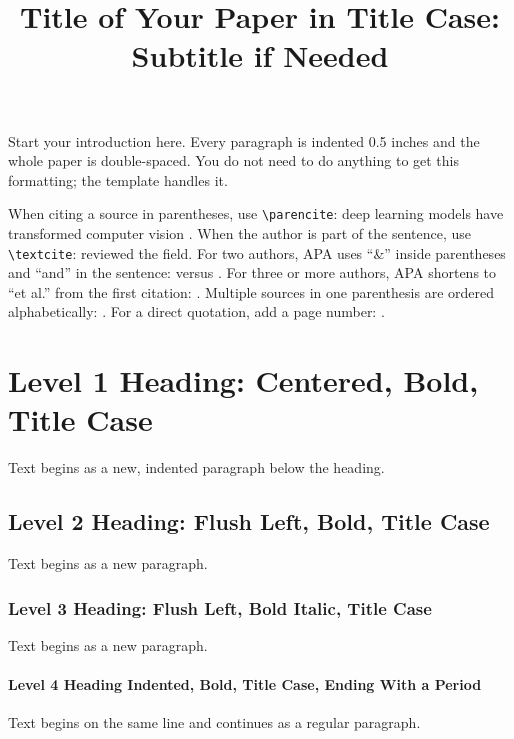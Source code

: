 \documentclass[stu,12pt,floatsintext]{apa7}
\title{Title of Your Paper in Title Case: Subtitle if Needed}
\begin{document}
\maketitle

Start your introduction here. Every paragraph is indented 0.5 inches and the
whole paper is double-spaced. You do not need to do anything to get this
formatting; the template handles it.

When citing a source in parentheses, use \verb|\parencite|: deep learning
models have transformed computer vision \parencite{lecun2015deep}. When the
author is part of the sentence, use \verb|\textcite|: \textcite{lecun2015deep}
reviewed the field. For two authors, APA uses ``\&'' inside parentheses and
``and'' in the sentence: \parencite{sutton2018reinforcement} versus
\textcite{sutton2018reinforcement}. For three or more authors, APA shortens to
``et al.'' from the first citation: \parencite{vaswani2017attention}.
Multiple sources in one parenthesis are ordered alphabetically:
\parencite{vaswani2017attention,lecun2015deep}. For a direct quotation, add a
page number: \parencite[p.~437]{lecun2015deep}.

\section{Level 1 Heading: Centered, Bold, Title Case}

Text begins as a new, indented paragraph below the heading.

\subsection{Level 2 Heading: Flush Left, Bold, Title Case}

Text begins as a new paragraph.

\subsubsection{Level 3 Heading: Flush Left, Bold Italic, Title Case}

Text begins as a new paragraph.

\paragraph{Level 4 Heading Indented, Bold, Title Case, Ending With a Period}
Text begins on the same line and continues as a regular paragraph.
\end{document}
